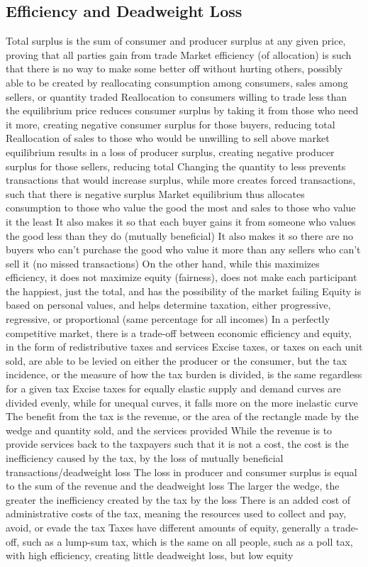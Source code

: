 \documentclass[11 pt, twoside]{article}
\newenvironment{outline*}
{
	\begin{outline}[enumerate]
	}
	{\end{outline}
}
\begin{document}
\subsection{Efficiency and Deadweight Loss}
\begin{outline*}
\1 Total surplus is the sum of consumer and producer surplus at any given price, proving that all parties gain from trade
\1 Market efficiency (of allocation) is such that there is no way to make some better off without hurting others, possibly able to be created by reallocating consumption among consumers, sales among sellers, or quantity traded
\2 Reallocation to consumers willing to trade less than the equilibrium price reduces consumer surplus by taking it from those who need it more, creating negative consumer surplus for those buyers, reducing total
\2 Reallocation of sales to those who would be unwilling to sell above market equilibrium results in a loss of producer surplus, creating negative producer surplus for those sellers, reducing total
\2 Changing the quantity to less prevents transactions that would increase surplus, while more creates forced transactions, such that there is negative surplus
\1 Market equilibrium thus allocates consumption to those who value the good the most and sales to those who value it the least
\2 It also makes it so that each buyer gains it from someone who values the good less than they do (mutually beneficial)
\2 It also makes it so there are no buyers who can't purchase the good who value it more than any sellers who can't sell it (no missed transactions)
\2 On the other hand, while this maximizes efficiency, it does not maximize equity (fairness), does not make each participant the happiest, just the total, and has the possibility of the market failing
\1 Equity is based on personal values, and helps determine taxation, either progressive, regressive, or proportional (same percentage for all incomes)
\2 In a perfectly competitive market, there is a trade-off between economic efficiency and equity, in the form of redistributive taxes and services
\1 Excise taxes, or taxes on each unit sold, are able to be levied on either the producer or the consumer, but the tax incidence, or the measure of how the tax burden is divided, is the same regardless for a given tax
\2 Excise taxes for equally elastic supply and demand curves are divided evenly, while for unequal curves, it falls more on the more inelastic curve
\2 The benefit from the tax is the revenue, or the area of the rectangle made by the wedge and quantity sold, and the services provided
\2 While the revenue is to provide services back to the taxpayers such that it is not a cost, the cost is the inefficiency caused by the tax, by the loss of mutually beneficial transactions/deadweight loss
\3 The loss in producer and consumer surplus is equal to the sum of the revenue and the deadweight loss
\3 The larger the wedge, the greater the inefficiency created by the tax by the loss
\3 There is an added cost of administrative costs of the tax, meaning the resources used to collect and pay, avoid, or evade the tax
\1 Taxes have different amounts of equity, generally a trade-off, such as a lump-sum tax, which is the same on all people, such as a poll tax, with high efficiency, creating little deadweight loss, but low equity
\end{outline*}
\end{document}

